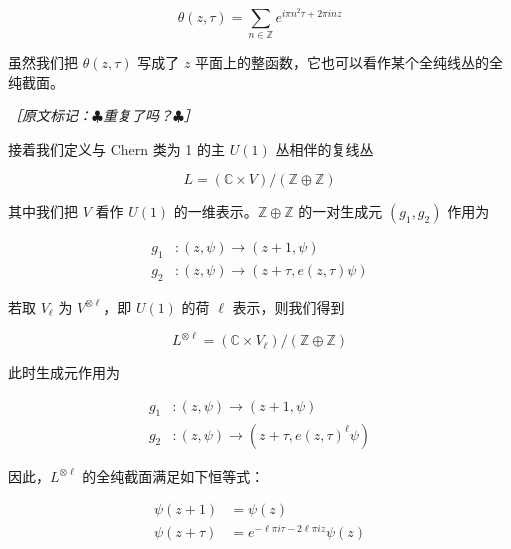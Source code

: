 \begin{equation}
  \theta(z,\tau)=\sum_{n\in\mathbb{Z}}e^{i\pi n^2\tau+2\pi inz}
  \tag{2.170}
  \label{eq:2.170}
\end{equation}

虽然我们把 $\theta(z,\tau)$ 写成了 $z$ 平面上的整函数，它也可以看作某个全纯线丛的全纯截面。

{\small\itshape ［原文标记：$\clubsuit$重复了吗？$\clubsuit$］}

接着我们定义与 Chern 类为 1 的主 $U(1)$ 丛相伴的复线丛

\begin{equation}
  L=(\mathbb{C}\times V)/(\mathbb{Z}\oplus\mathbb{Z})
  \tag{2.171}
  \label{eq:2.171}
\end{equation}

其中我们把 $V$ 看作 $U(1)$ 的一维表示。$\mathbb{Z}\oplus\mathbb{Z}$ 的一对生成元 $(g_1,g_2)$ 作用为

\begin{equation}
  \begin{aligned}
    g_1&:(z,\psi)\to(z+1,\psi)\\
    g_2&:(z,\psi)\to(z+\tau,e(z,\tau)\psi)
  \end{aligned}
  \tag{2.172}
  \label{eq:2.172}
\end{equation}

若取 $V_\ell$ 为 $V^{\otimes\ell}$，即 $U(1)$ 的荷 $\ell$ 表示，则我们得到

\begin{equation}
  L^{\otimes\ell}=(\mathbb{C}\times V_\ell)/(\mathbb{Z}\oplus\mathbb{Z})
  \tag{2.173}
  \label{eq:2.173}
\end{equation}

此时生成元作用为

\begin{equation}
  \begin{aligned}
    g_1&:(z,\psi)\to(z+1,\psi)\\
    g_2&:(z,\psi)\to(z+\tau,e(z,\tau)^\ell\psi)
  \end{aligned}
  \tag{2.174}
  \label{eq:2.174}
\end{equation}

因此，$L^{\otimes\ell}$ 的全纯截面满足如下恒等式：

\begin{equation}
  \begin{aligned}
    \psi(z+1)&=\psi(z)\\
    \psi(z+\tau)&=e^{-\ell\pi i\tau-2\ell\pi iz}\psi(z)
  \end{aligned}
  \tag{2.175}
  \label{eq:2.175}
\end{equation}

